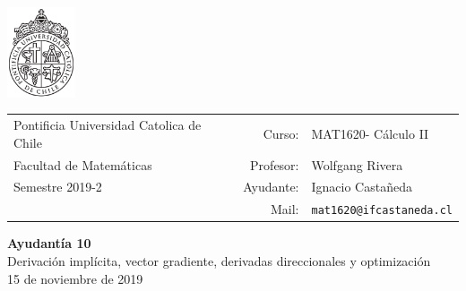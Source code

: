 \documentclass[12pt]{article}
\makeatletter
\newcommand{\ayudantia}{{\sc Ayudantía 10}}
\newcommand{\tituloayu}{Derivación implícita, vector gradiente, derivadas direccionales y optimización}
\newcommand{\fecha}{15 de noviembre de 2019}
\newcommand{\sigla}{MAT1620}
\newcommand{\nombre}{Cálculo II}
\newcommand{\profesor}{Wolfgang Rivera}
\newcommand{\ano}{2019}
\newcommand{\semestre}{2}
\newcommand{\mail}{mat1620@ifcastaneda.cl}
\makeatother
\begin{document}
\thispagestyle{empty}

\begin{minipage}{2cm}
	\includegraphics[width=2cm]{../../../../img/logo.pdf}
	\vspace{0.5cm}
\end{minipage}
\begin{minipage}{\linewidth}
	\begin{tabular}{lrl}
		{\scriptsize\sc Pontificia Universidad Catolica de Chile} & \hspace*{0.7in}Curso: &
		\sigla  - \nombre\\
		{\sc Facultad de Matemáticas}&
		Profesor: & \profesor \\
		{\sc Semestre \ano-\semestre} & Ayudante: & {Ignacio Castañeda}\\
		& {Mail:} & \texttt{\mail}
	\end{tabular}
\end{minipage}

\vspace{-10mm}
\begin{center}
	{\LARGE\bf \ayudantia}\\
	\vspace{0.1cm}
	{\tituloayu}\\
	\vspace{0.1cm}
	\fecha\\
	\vspace{0.4cm}
\end{center}
\end{document}
